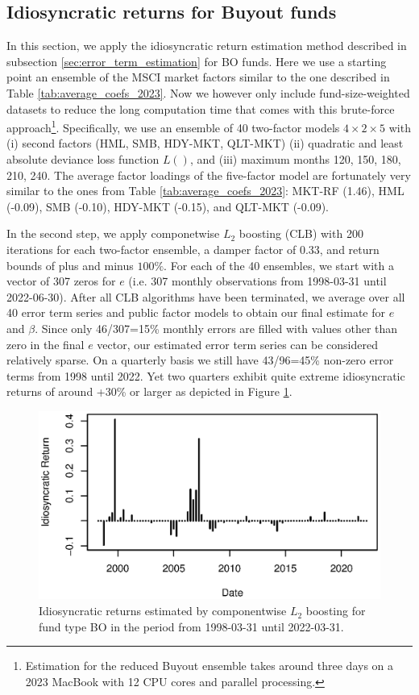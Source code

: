 \documentclass[12pt]{article}
\begin{document}
\subsection{Idiosyncratic returns for Buyout funds}
\label{sec:idiosyncratic_BO}

In this section, we apply the idiosyncratic return estimation method described in subsection \ref{sec:error_term_estimation} for BO funds.
Here we use a starting point an ensemble of the MSCI market factors similar to the one described in Table \ref{tab:average_coefs_2023}.
Now we however only include fund-size-weighted datasets to reduce the long computation time that comes with this brute-force approach\footnote{Estimation for the reduced Buyout ensemble takes around three days on a 2023 MacBook with 12 CPU cores and parallel processing.}.
Specifically, we use an ensemble of 40 two-factor models $4 \times 2 \times 5$  with (i) second factors (HML, SMB, HDY-MKT, QLT-MKT) (ii) quadratic and least absolute deviance loss function $L()$, and (iii) maximum months 120, 150, 180, 210, 240.
The average factor loadings of the five-factor model are fortunately very similar to the ones from Table \ref{tab:average_coefs_2023}:  
MKT-RF (1.46), 
HML (-0.09), 
SMB (-0.10), 
HDY-MKT (-0.15), and 
QLT-MKT (-0.09).

In the second step, we apply componetwise $L_2$ boosting (CLB) with 200 iterations for each two-factor ensemble, a damper factor of 0.33, and return bounds of plus and minus $100\%$.
For each of the 40 ensembles, we start with a vector of 307 zeros for $e$  (i.e. 307 monthly observations from 1998-03-31 until 2022-06-30).
After all CLB algorithms have been terminated, we average over all 40 error term series and public factor models to obtain our final estimate for $e$ and $\beta$.
Since only 46/307=15\% monthly errors are filled with values other than zero in the final $e$ vector, our estimated error term series can be considered relatively sparse.
On a quarterly basis we still have 43/96=45\% non-zero error terms from 1998 until 2022.
Yet two quarters exhibit quite extreme idiosyncratic returns of around +30\% or larger as depicted in Figure \ref{fig:clb_idio}.

\begin{figure}[H]
	\centering
	\includegraphics{Figures/XErrorSeriesBO}
	\caption{Idiosyncratic returns estimated by componentwise $L_2$ boosting for fund type BO in the period from 1998-03-31 until 2022-03-31.}
	\label{fig:clb_idio}
\end{figure}
\end{document}

